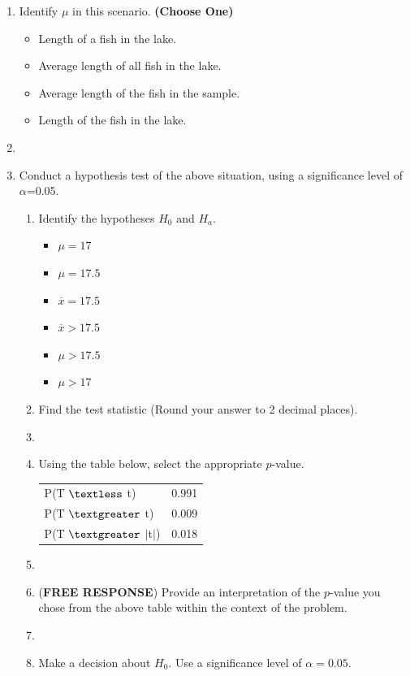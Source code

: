   \begin{enumerate}
  \item Identify $\mu$ in this scenario. \textbf{(Choose One)}
  \begin{itemize}
  	\item Length of a fish in the lake.
  	\item Average length of all fish in the lake.
  	\item Average length of the fish in the sample.
  	\item Length of the fish in the lake.
  \end{itemize}
  \item[]
  \item Conduct a hypothesis test of the above situation, using a significance level of $\alpha$=0.05.
    \begin{enumerate}
    \item Identify the hypotheses $H_0$ and $H_a$.
            \begin{itemize}
      \item  $\mu = 17$
      \item $\mu = 17.5$
      \item ${\overline x} = 17.5$
      \item ${\overline x} > 17.5$
      \item $\mu > 17.5$
      \item $\mu > 17$
      \end{itemize}
    \newpage
    \item Find the test statistic (Round your answer to 2 decimal places).
\item[]
\item Using the table below, select the appropriate $p$-value.
\begin{table}[h]
\centering
\begin{tabular}{l|l}
	\hline
	P(T $\textless$ t) & 0.991 \\
	P(T $\textgreater$ t) & 0.009 \\
	P(T $\textgreater$ $|$t$|$) & 0.018 \\
	\hline
\end{tabular}
\end{table}
\item[]
    \item  (\textbf{FREE RESPONSE}) Provide an interpretation of the $p$-value you chose from the above table within the context of the problem.
\item[]
    \item Make a decision about $H_{0}$. Use a significance level of $\alpha = 0.05$.

\end{enumerate}
\end{enumerate}
